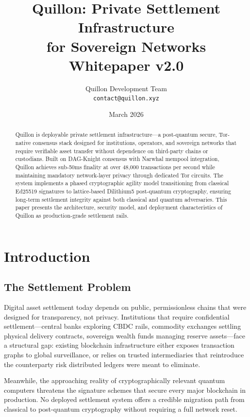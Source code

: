 \documentclass[11pt,a4paper]{article}
\title{\textbf{Quillon: Private Settlement Infrastructure\\for Sovereign Networks}\\
\large Whitepaper v2.0}
\author{Quillon Development Team\\
\texttt{contact@quillon.xyz}}
\date{March 2026}
\begin{document}
\maketitle

\begin{abstract}
Quillon is deployable private settlement infrastructure---a post-quantum secure, Tor-native consensus stack designed for institutions, operators, and sovereign networks that require verifiable asset transfer without dependence on third-party chains or custodians. Built on DAG-Knight consensus with Narwhal mempool integration, Quillon achieves sub-50ms finality at over 48,000 transactions per second while maintaining mandatory network-layer privacy through dedicated Tor circuits. The system implements a phased cryptographic agility model transitioning from classical Ed25519 signatures to lattice-based Dilithium5 post-quantum cryptography, ensuring long-term settlement integrity against both classical and quantum adversaries. This paper presents the architecture, security model, and deployment characteristics of Quillon as production-grade settlement rails.
\end{abstract}

\tableofcontents
\newpage

\section{Introduction}

\subsection{The Settlement Problem}

Digital asset settlement today depends on public, permissionless chains that were designed for transparency, not privacy. Institutions that require confidential settlement---central banks exploring CBDC rails, commodity exchanges settling physical delivery contracts, sovereign wealth funds managing reserve assets---face a structural gap: existing blockchain infrastructure either exposes transaction graphs to global surveillance, or relies on trusted intermediaries that reintroduce the counterparty risk distributed ledgers were meant to eliminate.

Meanwhile, the approaching reality of cryptographically relevant quantum computers threatens the signature schemes that secure every major blockchain in production. No deployed settlement system offers a credible migration path from classical to post-quantum cryptography without requiring a full network reset.
\end{document}
